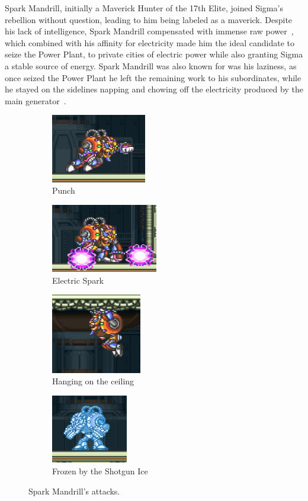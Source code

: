 Spark Mandrill, initially a Maverick Hunter of the 17th Elite, joined Sigma's rebellion without question, leading to him being labeled as a maverick. Despite his lack of intelligence, Spark Mandrill compensated with immense raw power~\cite{MHX:manual}, which combined with his affinity for electricity made him the ideal candidate to seize the Power Plant, to private cities of electric power while also granting Sigma a stable source of energy. Spark Mandrill was also known for was his laziness, as once seized the Power Plant he left the remaining work to his subordinates, while he stayed on the sidelines napping and chowing off the electricity produced by the main generator~\cite{wayback:X_resources}.
 
\begin{figure}[htp]
	\centering
	\begin{subfigure}{0.4\linewidth}
		\centering
		\includegraphics[height=3cm]{figures/X1/Spark_mandrill/Mandrill_punch.jpg}
		\caption{Punch}
	\end{subfigure}
	\begin{subfigure}{0.4\linewidth}
		\centering
		\includegraphics[height=3cm]{figures/X1/Spark_mandrill/Mandrill_spark.jpg}
		\caption{Electric Spark}
	\end{subfigure}
	\begin{subfigure}[t]{0.4\linewidth}
		\centering
		\includegraphics[height=3.5cm]{figures/X1/Spark_mandrill/Mandrill_hang.jpg}
		\caption{Hanging on the ceiling}
	\end{subfigure}
	\begin{subfigure}[t]{0.4\linewidth}
		\centering
		\includegraphics[height=3cm]{figures/X1/Spark_mandrill/Mandrill_frozen.jpg}
		\caption{Frozen by the Shotgun Ice}
	\end{subfigure}
	\caption{Spark Mandrill's attacks.}
\end{figure}

